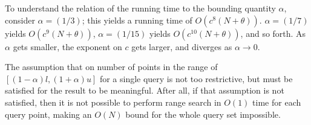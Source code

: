 





To understand the relation of the running time to the bounding quantity
$\alpha$, consider $\alpha =
(1 / 3)$; this yields a running time of $O(c^8 (N + \theta))$.  $\alpha = (1 /
7)$ yields $O(c^9 (N + \theta))$, $\alpha = (1 / 15)$ yields $O(c^{10} (N +
\theta))$, and so forth.  As $\alpha$ gets smaller, the exponent on $c$ gets
larger, and diverges as $\alpha \to 0$.

The assumption that on number of points in the range of $[(1 - \alpha)l, (1 +
\alpha)u]$ for a single query is not too restrictive, but must be satisfied for
the result to be meaningful.  After all, if that assumption is not satisfied,
then it is not possible to perform range search in $O(1)$ time for each query
point, making an $O(N)$ bound for the whole query set impossible.

